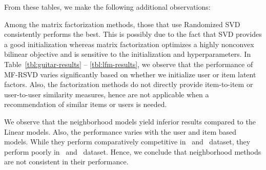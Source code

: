 From these tables, we make the following additional observations:
\begin{compactitem}

\item Among the matrix factorization methods, those that use Randomized SVD~\citep{Tang:2013} consistently performs the best. This is possibly due to the fact that SVD provides a good initialization
whereas matrix factorization optimizes a highly nonconvex bilinear objective and is sensitive to the initialization and hyperparameters. In Table~\ref{tbl:guitar-results} -- \ref{tbl:lfm-results}, we observe that the performance of MF-RSVD varies significantly based on whether we initialize user or item latent factors. Also, the factorization methods do not directly provide item-to-item or user-to-user similarity measures, hence are not applicable
when a recommendation of similar items or users is needed.
\item We observe that the neighborhood models yield inferior results compared to the Linear models. Also, the performance varies with the user and item based models. While they perform comparatively competitive in \Lowes\ and \Guitar\ dataset, they perform poorly in \LastFM\ and \MLens\ dataset. Hence, we conclude that neighborhood methods are not consistent in their performance.
\end{compactitem}
%
